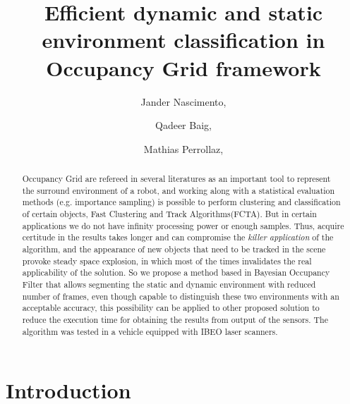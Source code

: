 \documentclass{llncs}
\begin{document}
\title{Efficient dynamic and static environment classification in Occupancy Grid framework}
\author{
Jander Nascimento,  \and 
Qadeer Baig,  \and 
Mathias Perrollaz, 
}

\maketitle

\begin{abstract}


Occupancy Grid are refereed in several literatures as an important tool to represent the surround environment of a robot, and working along with a statistical evaluation methods (e.g. importance sampling) is possible to perform clustering and classification of certain objects, Fast Clustering and Track Algorithms(FCTA). But in certain applications we do not have infinity processing power or enough samples. Thus, acquire certitude in the results takes longer and can compromise the \textit{killer application} of the algorithm, and the appearance of new objects that need to be tracked in the scene provoke steady space explosion, in which most of the times invalidates the real applicability of the solution. So we propose a method based in Bayesian Occupancy Filter that allows segmenting the static and dynamic environment with reduced number of frames, even though capable to distinguish these two environments with an acceptable accuracy, this possibility can be applied to other proposed solution to reduce the execution time for obtaining the results from output of the sensors. The algorithm was tested in a vehicle equipped with IBEO laser scanners.


\end{abstract}

\section{Introduction}
\end{document}
